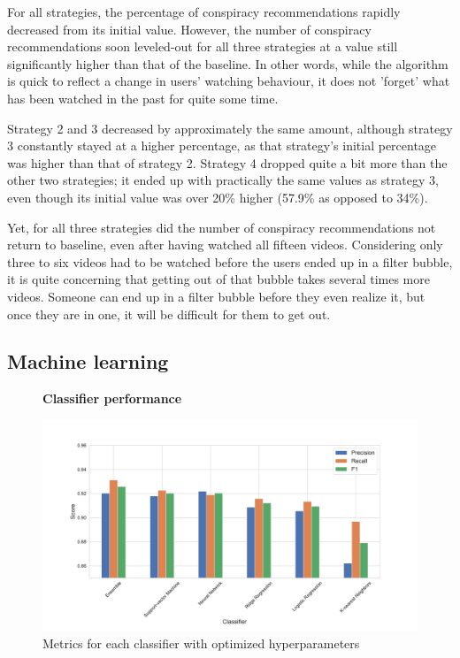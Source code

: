 \documentclass[../main.tex]{subfiles}
\begin{document}
For all strategies, the percentage of conspiracy recommendations rapidly decreased from its initial value. 
However, the number of conspiracy recommendations soon leveled-out for all three strategies at a value still 
significantly higher than that of the baseline. In other words, while the algorithm is quick to reflect a change
in users' watching behaviour, it does not 'forget' what has been watched in the past for quite some time. 

Strategy 2 and 3 decreased by approximately the same amount, although strategy 3 constantly stayed at a
higher percentage, as that strategy's initial percentage was higher than that of strategy 2. Strategy 4 dropped
quite a bit more than the other two strategies; it ended up with practically the same values as strategy 3, even
though its initial value was over 20\% higher (57.9\% as opposed to 34\%). 

Yet, for all three strategies did the number of conspiracy recommendations not return to baseline, even after 
having watched all fifteen videos. Considering only three to six videos had to be watched before the users ended
up in a filter bubble, it is quite concerning that getting out of that bubble takes several times more videos. 
Someone can end up in a filter bubble before they even realize it, but once they are in one, it will be 
difficult for them to get out. 

\subsection{Machine learning} \label{ML_results}

\begin{figure}
  \textbf{Classifier performance}\par\medskip
  \centering
  \includegraphics[keepaspectratio, width=\textwidth]{images/classifier_results.pdf}
  \caption{Metrics for each classifier with optimized hyperparameters}
  \label{fig:ML_scores}
\end{figure}
\end{document}
